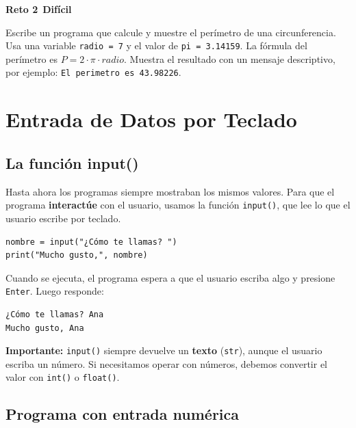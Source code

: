 \documentclass[11pt,a4paper]{article}
\newcommand{\dificil}{\textcolor{rojoAlerta}{\faIcon{circle}\,\textbf{Difícil}}}
\begin{document}
\begin{cajaReto}
\textbf{Reto 2} \dificil

Escribe un programa que calcule y muestre el perímetro de una circunferencia. Usa una variable \texttt{radio = 7} y el valor de \texttt{pi = 3.14159}. La fórmula del perímetro es $P = 2 \cdot \pi \cdot radio$. Muestra el resultado con un mensaje descriptivo, por ejemplo: \texttt{El perimetro es 43.98226}.
\end{cajaReto}

\section{Entrada de Datos por Teclado}

\subsection{La función input()}

Hasta ahora los programas siempre mostraban los mismos valores. Para que el programa \textbf{interactúe} con el usuario, usamos la función \texttt{input()}, que lee lo que el usuario escribe por teclado.

\begin{cajaEjemplo}
\begin{lstlisting}[style=pythonStyle, caption={Saludando al usuario}]
nombre = input("¿Cómo te llamas? ")
print("Mucho gusto,", nombre)
\end{lstlisting}

Cuando se ejecuta, el programa espera a que el usuario escriba algo y presione \texttt{Enter}. Luego responde:

\begin{lstlisting}[style=pythonStyle]
¿Cómo te llamas? Ana
Mucho gusto, Ana
\end{lstlisting}
\end{cajaEjemplo}

\begin{cajaRecuerda}
\textbf{Importante:} \texttt{input()} siempre devuelve un \textbf{texto} (\texttt{str}), aunque el usuario escriba un número. Si necesitamos operar con números, debemos convertir el valor con \texttt{int()} o \texttt{float()}.
\end{cajaRecuerda}

\subsection{Programa con entrada numérica}
\end{document}
